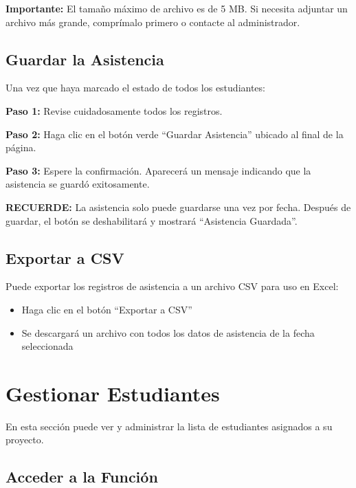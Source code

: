 \documentclass[11pt,a4paper]{article}
\begin{document}
\begin{warningbox}
\textbf{Importante:} El tamaño máximo de archivo es de 5 MB. Si necesita adjuntar un archivo más grande, comprímalo primero o contacte al administrador.
\end{warningbox}

\subsection{Guardar la Asistencia}

Una vez que haya marcado el estado de todos los estudiantes:

\textbf{Paso 1:} Revise cuidadosamente todos los registros.

\textbf{Paso 2:} Haga clic en el botón verde ``Guardar Asistencia'' ubicado al final de la página.

\textbf{Paso 3:} Espere la confirmación. Aparecerá un mensaje indicando que la asistencia se guardó exitosamente.

\begin{warningbox}
\textbf{RECUERDE:} La asistencia solo puede guardarse una vez por fecha. Después de guardar, el botón se deshabilitará y mostrará ``Asistencia Guardada''.
\end{warningbox}

\subsection{Exportar a CSV}

Puede exportar los registros de asistencia a un archivo CSV para uso en Excel:

\begin{itemize}
  \item Haga clic en el botón ``Exportar a CSV''
  \item Se descargará un archivo con todos los datos de asistencia de la fecha seleccionada
\end{itemize}

\section{Gestionar Estudiantes}

En esta sección puede ver y administrar la lista de estudiantes asignados a su proyecto.

\subsection{Acceder a la Función}
\end{document}
